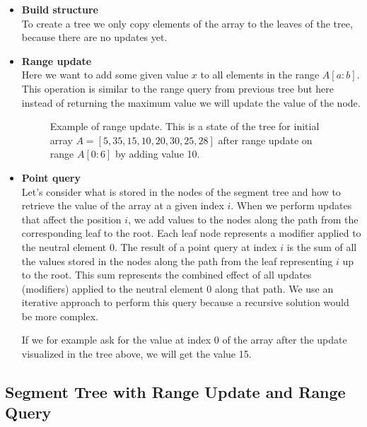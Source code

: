 \documentclass[11pt]{article}
\begin{document}
\begin{itemize}
    \item \textbf{Build structure} \\
    To create a tree we only copy elements of the array to the leaves of the tree, 
    because there are no updates yet.
    \FloatBarrier
    \item \textbf{Range update} \\
    Here we want to add some given value $x$ to all elements in the range $A[a:b]$.
    This operation is similar to the range query from previous tree but here instead of
    returning the maximum value we will update the value of the node.
    
    \begin{figure}[H]
        \centering
        
        \caption{Example of range update. This is a state of the tree for initial array $A = [5, 35, 15, 10, 20, 30, 25, 28]$ after range update on range $A[0:6]$ by adding value 10.}
    \end{figure}

    \item \textbf{Point query} \\
    Let's consider what is stored in the nodes of the segment tree and how to retrieve the value of the array at a given index \( i \).
    When we perform updates that affect the position \( i \), we add values to the nodes along the path from the corresponding leaf to the root. Each leaf node represents a modifier applied to the neutral element \( 0 \).
    The result of a point query at index \( i \) is the sum of all the values stored in the nodes along the path from the leaf representing \( i \) up to the root. This sum represents the combined effect of all updates (modifiers) applied to the neutral element \( 0 \) along that path.
    We use an iterative approach to perform this query because a recursive solution would be more complex.
    

    If we for example ask for the value at index 0 of the array after the update visualized in
    the tree above, we will get the value 15. \\
\end{itemize}

\subsection{Segment Tree with Range Update and Range Query}
\end{document}
